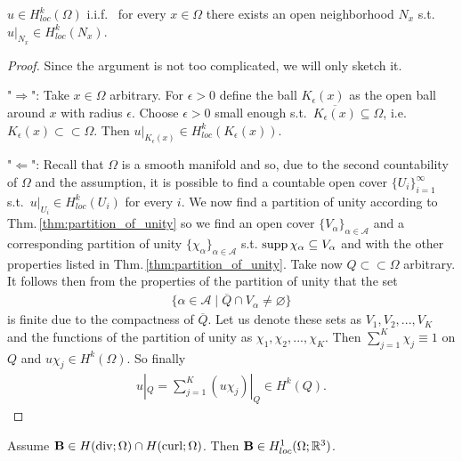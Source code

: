 \documentclass[../master_thesis.tex]{subfiles}
\begin{document}
\begin{lemma}\label{lem:Hkloc_iif_Sobolev_in_neighborhood}
    $u \in H^k_{loc}(\Omega)$ i.i.f.~ for every $x \in \Omega$ there exists 
    an open neighborhood $N_x$ s.t.~$u|_{N_x} \in H^k_{loc}(N_x)$.
\end{lemma}
\begin{proof}
    Since the argument is not too complicated, we will only sketch it.


    \noindent"$\Rightarrow$": Take $x \in \Omega$ arbitrary. For $\epsilon > 0$ define 
    the ball $K_\epsilon(x)$ as the open ball around $x$ with radius $\epsilon$.
    Choose $\epsilon >0 $
    small enough s.t.~$\overline{ K_\epsilon(x)} \subseteq \Omega$, i.e.
    $K_\epsilon(x) \subset\subset \Omega$. Then $u|_{K_\epsilon(x)} \in H^k_{loc}(K_\epsilon(x))$.

    \noindent"$\Leftarrow$": 
    Recall that $\Omega$ is a smooth manifold and so,
    due to the second countability of $\Omega$ and the assumption, it is possible to find a countable open cover 
    $\{ U_i \}_{i=1}^{\infty}$ s.t.~$u|_{U_i}\in H^k_{loc}(U_i)$ for every $i$.
    We now find a partition of unity according to Thm.\,\ref{thm:partition_of_unity}
    so we find an open cover $\{ V_\alpha \}_{\alpha\in \mathcal{A}}$ and a corresponding
    partition of unity $\{ \chi_\alpha \}_{\alpha \in \mathcal{A}}$
    s.t. $\operatorname{supp} \chi_\alpha \subseteq V_\alpha$ and with the other properties listed in 
    Thm.\,\ref{thm:partition_of_unity}. 
    Take now $Q \subset\subset \Omega$ arbitrary.
    It follows then from the properties of 
    the partition of unity that the set 
    \begin{align*}
        \{ \alpha \in \mathcal{A} \mid \overline{Q} \cap V_\alpha \neq \varnothing \}
    \end{align*}
    is finite due to the compactness of $\overline{Q}$. 
    Let us denote these sets as $V_1, V_2, ..., V_K$ and the functions of the partition of 
    unity as $\chi_1, \chi_2, ..., \chi_K$. Then $\sum_{j=1}^K \chi_j \equiv 1$ on $Q$ 
    and $u\chi_j \in H^k(\Omega)$. So finally 
    \begin{align*}
        u|_Q = \sum_{j=1}^K (u \chi_j)|_Q \in H^k(Q).
    \end{align*}
\end{proof}
\begin{theorem}\label{thm:solution_in_H1loc}
    Assume $\mathbf{B} \in H(\operatorname{div};\Omega) \cap H(\operatorname{curl};\Omega)$. Then 
    $\mathbf{B} \in H^1_{loc}(\Omega;\mathbb{R}^3)$.
\end{theorem}
\end{document}
